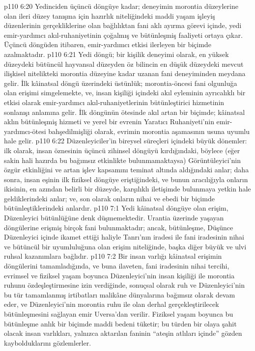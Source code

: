 \vs p110 6:20 Yedinciden üçüncü döngüye kadar; deneyimin morontia düzeylerine olan ileri düzey tanışma için hazırlık niteliğindeki maddi yaşam işleyiş düzenlerinin gerçekliklerine olan bağlılıktan fani aklı ayırma görevi içinde, yedi emir\hyp{}yardımcı akıl\hyp{}ruhaniyetinin çoğalmış ve bütünleşmiş faaliyeti ortaya çıkar. Üçüncü döngüden itibaren, emir\hyp{}yardımcı etkisi ilerleyen bir biçimde azalmaktadır.
\vs p110 6:21 Yedi döngü; bir kişilik deneyimi olarak, en yüksek düzeydeki bütüncül hayvansal düzeyden öz bilincin en düşük düzeydeki mevcut ilişkisel nitelikteki morontia düzeyine kadar uzanan fani deneyiminden meydana gelir. İlk kâinatsal döngü üzerindeki üstünlük; morontia\hyp{}öncesi fani olgunluğa olan erişimi simgelemekte, ve, insan kişiliği içindeki akıl eyleminin ayrıcalıklı bir etkisi olarak emir\hyp{}yardımcı akıl\hyp{}ruhaniyetlerinin bütünleştirici hizmetinin sonlanışı anlamına gelir. İlk döngünün ötesinde akıl artan bir biçimde; kâinatsal aklın bütünleşmiş hizmeti ve yerel bir evrenin Yaratıcı Ruhaniyeti’nin emir\hyp{}yardımcı\hyp{}ötesi bahşedilmişliği olarak, evrimin morontia aşamasının usuna uyumlu hale gelir.
\vs p110 6:22 Düzenleyiciler’in bireysel süreçleri içindeki büyük dönemler: ilk olarak, insan öznesinin üçüncü zihinsel döngüyü kırdığındaki, böylece (eğer sakin hali hazırda bu bağımsız etkinlikte bulunmamaktaysa) Görüntüleyici’nin özgür etkinliğini ve artan işlev kapsamını teminat altında aldığındaki anlar; daha sonra, insan eşinin ilk fiziksel döngüye eriştiğindeki, ve bunun aracılığıyla onların ikisinin, en azından belirli bir düzeyde, karşılıklı iletişimde bulunmaya yetkin hale geldiklerindeki anlar; ve, son olarak onların nihai ve ebedi bir biçimde bütünleştiklerindeki anlardır.
\vs p110 7:1 Yedi kâinatsal döngüye olan erişim, Düzenleyici bütünlüğüne denk düşmemektedir. Urantia üzerinde yaşayan döngülerine erişmiş birçok fani bulunmaktadır; ancak, bütünleşme, Düşünce Düzenleyici içinde ikamet ettiği haliyle Tanrı’nın iradesi ile fani iradesinin nihai ve bütüncül bir uyumluluğuna olan erişim niteliğinde, başka diğer büyük ve ulvi ruhsal kazanımlara bağlıdır.
\vs p110 7:2 Bir insan varlığı kâinatsal erişimin döngülerini tamamladığında, ve buna ilaveten, fani iradesinin nihai tercihi, evrimsel ve fiziksel yaşam boyunca Düzenleyici’nin insan kişiliği ile morontia ruhunu özdeşleştirmesine izin verdiğinde, sonuçsal olarak ruh ve Düzenleyici’nin bu tür tamamlanmış irtibatları malikâne dünyalarına bağımsız olarak devam eder, ve Düzenleyici’nin morontia ruhu ile olan derhal gerçekleştirilecek bütünleşmesini sağlayan emir Uversa’dan verilir. Fiziksel yaşam boyunca bu bütünleşme anlık bir biçimde maddi bedeni tüketir; bu türden bir olaya şahit olacak insan varlıkları, yalnızca aktarılan faninin “ateşin atlıları içinde” gözden kaybolduklarını gözlemlerler.
